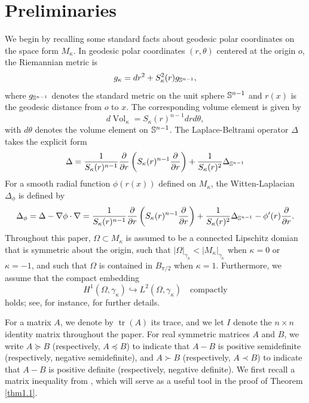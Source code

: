 \documentclass[11pt,leqno]{amsart}
\def\k{\kappa}
\def\p{\partial}
\def\S{\Bbb S}
\def\k{\kappa}
\def \p {\partial}
\def\V{\operatorname{Vol}}
\def\tr{\operatorname{tr}}
\def\tr{\operatorname{tr}}
\numberwithin{equation}{section}
\begin{document}
\section{Preliminaries}\label{sect2}
We begin by recalling some standard facts about geodesic polar coordinates on the space form $M_\k$. In geodesic polar coordinates $(r, \theta)$ centered at the origin $o$, the  Riemannian metric is $$g_\k=dr^{2}+S_{\kappa}^{2}(r)g_{\S^{n-1}},$$
where $g_{\S^{n-1}}$ denotes the standard metric on the unit sphere $\S^{n-1}$ and $r(x)$ is the geodesic distance from $o$ to $x$. The  corresponding volume element is given by
$$d\V_\k=S_{\kappa}(r)^{n-1}drd\theta,$$
with $d\theta$ denotes the volume element on $\S^{n-1}$.
The Laplace-Beltrami operator $\Delta$  takes the explicit form
\begin{align*}
    \Delta=\frac{1}{S_\k(r)^{n-1}}\frac{\partial }{\partial r}\left(S_\k(r)^{n-1}\frac{\p}{\p r}\right)+\frac{1}{S_\k(r)^2}\Delta_{\S^{n-1}}
\end{align*}
For a smooth radial function $\phi(r(x))$ defined on $M_{\kappa}$, 
the Witten-Laplacian $ \Delta_{\phi}$ is defined by
\begin{align*}
    \Delta_{\phi}=\Delta-\nabla\phi\cdot \nabla=\frac{1}{S_\k(r)^{n-1}}\frac{\partial}{\partial r}\left(S_\k(r)^{n-1}\frac{\p}{\p r}\right)+\frac{1}{S_\k(r)^2}\Delta_{\S^{n-1}}-\phi'(r)\frac{\p}{\p r}.
\end{align*}
Throughout this paper, $\Omega \subset M_\k$ is assumed to be a  connected Lipschitz domian that is symmetric about the origin,  such that $|\Omega|_{\gamma_\k}< |M_\k|_{\gamma_\k}$ when $\k=0$ or $\k=-1$, and such that $\Omega$ is contained in $B_{\pi/2}$ when $\k=1$. Furthermore, we assume that the compact embedding
\begin{equation}\label{eq:compact-embedding}
H^1(\Omega,\gamma_{\k})\hookrightarrow L^2(\Omega,\gamma_{\k})
\quad\text{compactly}
\end{equation}
holds; see, for instance,  \cite[Definition 2.1 and Remark 2.1]{CG22} for  further details.

 For a matrix $A$, we denote by $\tr(A)$ its trace, and we let $I$ denote the  $n\times n$ identity matrix throughout the paper.
 For real symmetric matrices $A$ and $B$, we write $A\succeq B$ (respectively, $A\preceq B$)   to indicate that $A-B$ is  positive semidefinite (respectively, negative semidefinite), and $A\succ B$ (respectively, $A\prec B$)   to indicate that $A-B$ is  positive definite (respectively, negative definite).
We first recall  a matrix inequality from \cite{HLT26}, which will serve as a useful tool in the proof of Theorem \ref{thm1.1}. 
\end{document}
